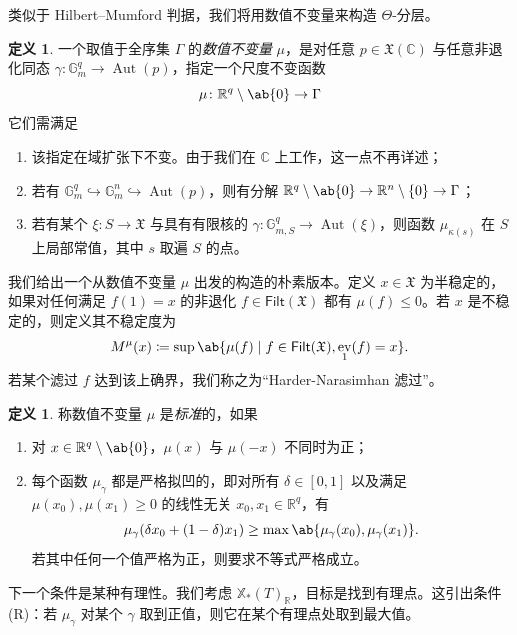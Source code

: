 \documentclass{amsart}
\theoremstyle{definition}
\newtheorem{defn}[thm]{定义}
\theoremstyle{remark}
\theoremstyle{plain}
\theoremstyle{definition}
\theoremstyle{remark}
\newcommand{\G}{\mathbb{G}}
\newcommand{\R}{\mathbb{R}}
\newcommand{\C}{\mathbb{C}}
\newcommand{\mf}[1]{\mathfrak{#1}}
\newcommand{\ms}[1]{\mathsf{#1}}
\newcommand{\1}{\mathbf{1}}
\newcommand{\2}{\mathbf{2}}
\newcommand{\3}{\mathbf{3}}
\DeclareMathOperator{\Aut}{Aut}
\DeclareMathOperator{\ev}{ev}
\begin{document}
类似于 Hilbert--Mumford 判据，我们将用数值不变量来构造 \(\Theta\)-分层。
\begin{defn}
    一个取值于全序集 \(\Gamma\) 的\textit{数值不变量} \(\mu\)，是对任意 \(p \in \mf{X}(\C)\) 与任意非退化同态 \(\gamma \colon \G_m^q \to \Aut(p)\)，指定一个尺度不变函数
    \[ \mu \colon \R^q \setminus \ab\{0\} \to \Gamma \]
    它们需满足
    \begin{enumerate}
        \item 该指定在域扩张下不变。由于我们在 \(\C\) 上工作，这一点不再详述；
        \item 若有 \(\G_m^q \hookrightarrow \G_m^n \hookrightarrow \Aut(p)\)，则有分解 \(\R^q \setminus \ab\{0\} \to \R^n \setminus \{0\} \to \Gamma\)；
        \item 若有某个 \(\xi \colon S \to \mf{X}\) 与具有有限核的 \(\gamma \colon \G_{m, S}^q \to \Aut(\xi)\)，则函数 \(\mu_{\kappa(s)}\) 在 \(S\) 上局部常值，其中 \(s\) 取遍 \(S\) 的点。
    \end{enumerate}
\end{defn}

我们给出一个从数值不变量 \(\mu\) 出发的构造的朴素版本。定义 \(x \in \mf{X}\) 为半稳定的，如果对任何满足 \(f(1) = x\) 的非退化 \(f \in \ms{Filt}(\mf{X})\) 都有 \(\mu(f) \leq 0\)。若 \(x\) 是不稳定的，则定义其不稳定度为
\[ M^{\mu}(x) \coloneqq \sup \ab\{ \mu(f) \mid f \in \ms{Filt}(\mf{X}), \ev_1(f) = x\}. \]
若某个滤过 \(f\) 达到该上确界，我们称之为“Harder-Narasimhan 滤过”。

\begin{defn}
    称数值不变量 \(\mu\) 是\textit{标准}的，如果
    \begin{enumerate}
        \item 对 \(x \in \R^q \setminus \ab\{0\}\)，\(\mu(x)\) 与 \(\mu(-x)\) 不同时为正；
        \item 每个函数 \(\mu_{\gamma}\) 都是严格拟凹的，即对所有 \(\delta \in [0,1]\) 以及满足 \(\mu(x_0), \mu(x_1) \geq 0\) 的线性无关 \(x_0, x_1 \in \R^q\)，有 
            \[\mu_{\gamma}(\delta x_0 + (1-\delta)x_1) \geq \max\ab\{\mu_{\gamma}(x_0), \mu_{\gamma}(x_1)\}.\] 若其中任何一个值严格为正，则要求不等式严格成立。
    \end{enumerate}
\end{defn}

下一个条件是某种有理性。我们考虑 \(\mathbb{X}_*(T)_{\R}\)，目标是找到有理点。这引出条件 (R)：若 \(\mu_{\gamma}\) 对某个 \(\gamma\) 取到正值，则它在某个有理点处取到最大值。
\end{document}
